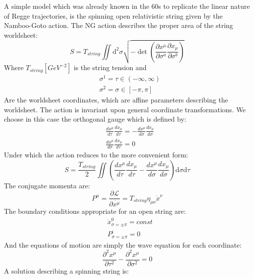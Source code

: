 \documentclass[11pt,a4paper]{article}
\begin{document}
A simple model which was already known in the 60s \cite{Collins} to replicate the linear nature of Regge trajectories, is the spinning open relativistic string given by the Namboo-Goto action. The NG action describes the proper area of the string worldsheet:
\begin{equation}
S=T_{string}\iint \mathrm{d}^2\sigma \sqrt{-\det\left(\frac{\partial x^\mu}{\partial \sigma^a}\frac{\partial x_\mu}{\partial \sigma^b}\right)}
\end{equation}
Where $T_{string}\left[GeV^{-2}\right]$ is the string tension and
\begin{align}
&\sigma^1=\tau\in\left(-\infty,\infty\right)\\
&\sigma^2=\sigma\in\left[-\pi,\pi\right]
\end{align}
Are the worldsheet coordinates, which are affine parameters describing the worldsheet. The action is invariant upon general coordinate transformations. We choose in this case the orthogonal gauge which is defined by:
\begin{subequations}
\begin{align}
&\frac{dx^\mu}{d\tau} \frac{dx_\mu}{d\tau}=-\frac{dx^\mu}{d\sigma}\frac{dx_\mu}{d\sigma}\\
&\frac{dx^\mu}{d\sigma} \frac{dx_\mu}{d\tau}=0
\end{align}
\end{subequations}
Under which the action reduces to the more convenient form:
\begin{equation}
S=\frac{T_{string}}{2}\iint \left( \frac{dx^\mu}{d\tau} \frac{dx_\mu}{d\tau}-\frac{dx^\mu}{d\sigma} \frac{dx_\mu}{d\sigma} \right)\mathrm{d}\sigma\mathrm{d}\tau
\end{equation}
The conjugate momenta are:
\begin{equation}
P^\mu=\frac{\partial \mathcal{L}}{\partial \dot{x^\mu}}=T_{string} \eta_{\mu\nu}\dot{x}^\nu 
\end{equation}
The boundary conditions appropriate for an open string are:
\begin{subequations}
\begin{align}
&\dot{x}^0_{\sigma=\pm\pi}=const\\
&P^i_{\sigma=\pm\pi}=0
\end{align}
\end{subequations}
And the equations of motion are simply the wave equation for each coordinate:
\begin{equation}
\frac{\partial^2 {x}^\mu}{\partial \tau^2}-\frac{\partial^2 {x}^\mu}{\partial \sigma^2}=0
\end{equation}
A solution describing a spinning string is:
\end{document}
